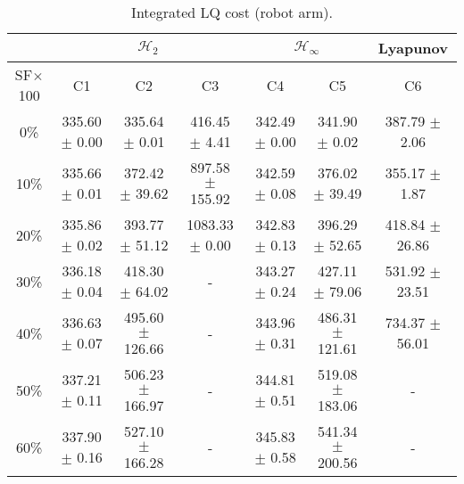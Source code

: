 \begin{table}[H]
\centering
\scriptsize
\begin{tabular}{| c || c | c | c | c | c | c |}
	\hline
	 & \multicolumn{3}{c|}{$\mathcal{H}_{2}$} & \multicolumn{2}{c|}{$\mathcal{H}_{\infty}$} & Lyapunov\\
	\hline
	SF$\times$100 & C1& C2 & C3 & C4 & C5 & C6\\
	\hline\hline
	0\% & 335.60 $\pm$ 0.00 & 335.64 $\pm$ 0.01 & 416.45 $\pm$ 4.41 & 342.49 $\pm$ 0.00 & 341.90 $\pm$ 0.02 & 387.79 $\pm$ 2.06\\
	\hline
	10\% & 335.66 $\pm$ 0.01 & 372.42 $\pm$ 39.62 & 897.58 $\pm$ 155.92 & 342.59 $\pm$ 0.08 & 376.02 $\pm$ 39.49 & 355.17 $\pm$ 1.87\\
	\hline
	20\% & 335.86 $\pm$ 0.02 & 393.77 $\pm$ 51.12 & 1083.33 $\pm$ 0.00 & 342.83 $\pm$ 0.13 & 396.29 $\pm$ 52.65 & 418.84 $\pm$ 26.86\\
	\hline
	30\% & 336.18 $\pm$ 0.04 & 418.30 $\pm$ 64.02 & - & 343.27 $\pm$ 0.24 & 427.11 $\pm$ 79.06 & 531.92 $\pm$ 23.51\\
	\hline
	40\% & 336.63 $\pm$ 0.07 & 495.60 $\pm$ 126.66 & - & 343.96 $\pm$ 0.31 & 486.31 $\pm$ 121.61 & 734.37 $\pm$ 56.01\\
	\hline
	50\% & 337.21 $\pm$ 0.11 & 506.23 $\pm$ 166.97 & - & 344.81 $\pm$ 0.51 & 519.08 $\pm$ 183.06 & -\\
	\hline
	60\% & 337.90 $\pm$ 0.16 & 527.10 $\pm$ 166.28 & - & 345.83 $\pm$ 0.58 & 541.34 $\pm$ 200.56 & -\\
	\hline
\end{tabular}
\caption{Integrated LQ cost (robot arm).}
\label{table:lq_cost_robot_arm:noise}
\end{table}
